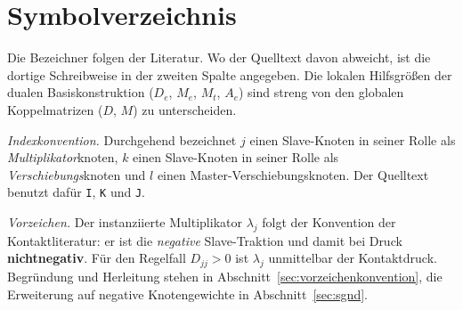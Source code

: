 \documentclass[a4paper,11pt]{article}
\def\bm#1{#1}%
\def\tilde#1{#1}%
\newcommand{\code}[1]{\texttt{\small #1}}
\let\stdsection\section
\renewcommand{\section}{\clearpage\stdsection}
\begin{document}
\section*{Symbolverzeichnis}

Die Bezeichner folgen der Literatur. Wo der Quelltext davon abweicht, ist die dortige Schreibweise
in der zweiten Spalte angegeben. Die lokalen Hilfsgrößen der dualen Basiskonstruktion ($\bm D_e$,
$\bm M_e$, $\bm M_t$, $\bm A_e$) sind streng von den globalen Koppelmatrizen ($\bm D$, $\bm M$) zu
unterscheiden.

\medskip
\noindent\emph{Indexkonvention.} Durchgehend bezeichnet $j$ einen Slave-Knoten in seiner Rolle als
\emph{Multiplikator}knoten, $k$ einen Slave-Knoten in seiner Rolle als \emph{Verschiebungs}knoten
und $l$ einen Master-Verschiebungsknoten. Der Quelltext benutzt dafür \code{I}, \code{K} und
\code{J}.

\medskip
\noindent\emph{Vorzeichen.} Der instanziierte Multiplikator $\lambda_j$ folgt der Konvention der
Kontaktliteratur: er ist die \emph{negative} Slave-Traktion und damit bei Druck
\textbf{nichtnegativ}. Für den Regelfall $\tilde D_{jj}>0$ ist $\lambda_j$ unmittelbar der
Kontaktdruck. Begründung und Herleitung stehen in Abschnitt~\ref{sec:vorzeichenkonvention}, die
Erweiterung auf negative Knotengewichte in Abschnitt~\ref{sec:sgnd}.
\end{document}
